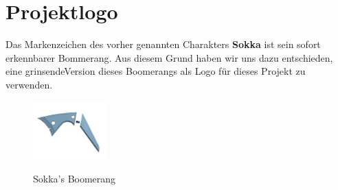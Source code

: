\newpage

\section{Projektlogo}

Das Markenzeichen des vorher genannten Charakters \textbf{Sokka} ist sein sofort erkennbarer Bommerang. Aus diesem Grund haben wir uns dazu entschieden, eine \glqq grinsende\grqq Version dieses Boomerangs als Logo für dieses Projekt zu verwenden.

\begin{figure}[H]
    \begin{center}
        \includegraphics[width=0.25\textwidth]{images/Intro/Boomerang.png}
        \caption{Sokka's Boomerang}
        \cite{aguilar2020}
    \end{center}
\end{figure}